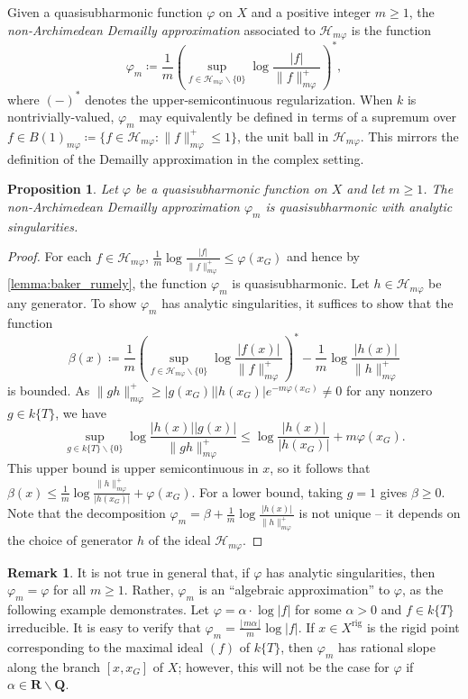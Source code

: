 \documentclass[10pt,reqno]{amsart}
\theoremstyle{plain}
\newtheorem{proposition}[theorem]{Proposition}
\theoremstyle{definition}
\newtheorem{remark}[theorem]{Remark}
\newcommand{\R}{\mathbf{R}}
\newcommand{\Q}{\mathbf{Q}}
\renewcommand{\H}{\mathcal{H}}
\numberwithin{equation}{section}
\DeclareMathOperator{\rig}{rig}
\begin{document}
Given a quasisubharmonic function $\varphi$ on $X$ and a positive integer $m \geq 1$, the \emph{non-Archimedean Demailly approximation} associated to $\H_{m\varphi}$ is the function
$$
\varphi_m \coloneqq \frac{1}{m} \left( \sup_{f \in \H_{m\varphi} \backslash \{ 0 \}} \log \frac{|f|}{\| f \|^+_{m\varphi}} \right)^*,
$$
where $( - )^*$ denotes the upper-semicontinuous regularization.
When $k$ is nontrivially-valued, $\varphi_m$ may equivalently be defined in terms of a supremum over $f \in B(1)_{m\varphi} \coloneqq \{ f \in \H_{m\varphi} \colon \| f \|^+_{m\varphi} \leq 1 \}$, the unit ball in $\H_{m\varphi}$. This mirrors the definition of the Demailly approximation in the complex setting.

\begin{proposition}
Let $\varphi$ be a quasisubharmonic function on $X$ and let $m \geq 1$. The non-Archimedean Demailly approximation $\varphi_m$ is quasisubharmonic with analytic singularities.
\end{proposition}

\begin{proof}
For each $f \in \H_{m\varphi}$, $\frac{1}{m} \log \frac{|f|}{\| f \|^+_{m\varphi}} \leq \varphi(x_G)$ and hence by \cref{lemma:baker_rumely}, the function $\varphi_m$ is quasisubharmonic. Let $h \in \H_{m\varphi}$ be any generator. To show $\varphi_m$ has analytic singularities, it suffices to show that the function
$$
\beta(x) \coloneqq \frac{1}{m}\left(\sup_{f \in \H_{m\varphi} \backslash \{ 0 \}} \log \frac{|f(x)|}{\| f \|^+_{m\varphi}} \right)^*- \frac{1}{m} \log \frac{|h(x)|}{\| h \|^+_{m \varphi}} 
$$
is bounded. As $\| g h \|^+_{m\varphi} \geq |g(x_G)| |h(x_G)| e^{-m\varphi(x_G)} \not= 0$ for any nonzero $g \in k\{ T \}$, we have 
$$
\sup_{g \in k\{ T \}\backslash \{ 0 \}} \log \frac{|h(x)| |g(x)|}{\| g h \|^+_{m\varphi}} \leq \log \frac{|h(x)|}{|h(x_G)|} + m\varphi(x_G). 
$$
This upper bound is upper semicontinuous in $x$, so it follows that $\beta(x) \leq \frac{1}{m} \log \frac{\| h \|^+_{m\varphi}}{|h(x_G)|} + \varphi(x_G)$. 
For a lower bound, taking $g = 1$ gives $\beta \geq 0$.
Note that the decomposition $\varphi_m = \beta + \frac{1}{m}\log \frac{|h(x)|}{\| h \|^+_{m\varphi}}$ is not unique -- it depends on the choice of generator $h$ of the ideal $\H_{m\varphi}$.
\end{proof}

\begin{remark}
It is not true in general that, if $\varphi$ has analytic singularities, then $\varphi_m = \varphi$ for all $m \geq 1$. Rather, $\varphi_m$ is an ``algebraic approximation'' to $\varphi$, as the following example demonstrates. Let $\varphi = \alpha \cdot \log |f|$ for some $\alpha > 0$ and $f \in k\{ T \}$ irreducible. It is easy to verify that $\varphi_m = \frac{\lfloor m\alpha \rfloor}{m} \log |f|$. If $x \in X^{\rig}$ is the rigid point corresponding to the maximal ideal $(f)$ of $k\{ T\}$, then $\varphi_m$ has rational slope along the branch $[x,x_G]$ of $X$; however, this will not be the case for $\varphi$ if $\alpha \in \R \backslash \Q$.
\end{remark}
\end{document}
